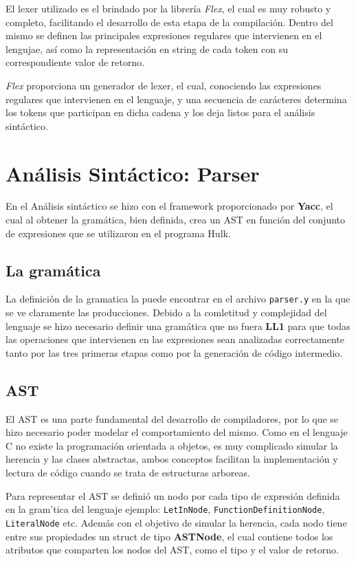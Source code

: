 \documentclass[11pt, a4paper, twoside]{article} %
\begin{document}
El lexer utilizado es el brindado por la librer\'ia \textit{Flex}, el cual es muy robusto y completo, facilitando el desarrollo
de esta etapa de la compilaci\'on. Dentro del mismo se definen las principales expresiones regulares que intervienen en el lengujae,
as\'i como la representaci\'on en string de cada token con su correspondiente valor de retorno.

\textit{Flex} proporciona un generador de lexer, el cual, conociendo las expresiones regulares que intervienen en el lenguaje, y una secuencia de
car\'acteres determina los tokens que participan en dicha cadena y los deja listos para el an\'alisis sint\'actico.

\section{An\'alisis Sint\'actico: Parser}
En el An\'alisis sint\'actico se hizo con el framework proporcionado por \textbf{Yacc}, el cual al obtener la gram\'atica, bien definida, 
crea un AST en funci\'on del conjunto de expresiones que se utilizaron en el programa Hulk. 

\subsection{La gram\'atica}
La definici\'on de la gramatica la puede encontrar en el archivo \texttt{parser.y} en la que se ve claramente las producciones. Debido a la comletitud
y complejidad del lenguaje se hizo necesario definir una gram\'atica que no fuera \textbf{LL1} para que todas las operaciones que intervienen en las expresiones
sean analizadas correctamente tanto por las tres primeras etapas como por la generaci\'on de c\'odigo intermedio.

\subsection{AST}
El AST es una parte fundamental del desarrollo de compiladores, por lo que se hizo necesario poder modelar el comportamiento del mismo. Como en el lenguaje C no
existe la programaci\'on orientada a objetos, es muy complicado simular la herencia y las clases abstractas, ambos conceptos facilitan la implementaci\'on y 
lectura de c\'odigo cuando se trata de estructuras arboreas.

Para representar el AST se defini\'o un nodo por cada tipo de expresi\'on definida en la gram\a'tica del lenguaje ejemplo: \texttt{LetInNode}, \texttt{FunctionDefinitionNode}, 
\texttt{LiteralNode} etc. Adem\'as con el objetivo de simular la herencia, cada nodo tiene entre sus propiedades un struct de tipo \textbf{ASTNode}, el cual contiene
todos los atributos que comparten los nodos del AST, como el tipo y el valor de retorno.
\end{document}
